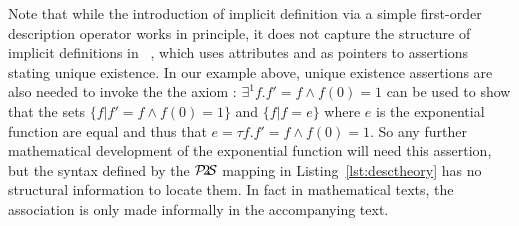 \documentclass{article}
\def\ptos{\ensuremath{\mathcal{P}\kern-.2em2\kern-.2em\mathcal{S}}}
\begin{document}
Note that while the introduction of implicit definition via a simple first-order
description operator works in principle, it does not capture the structure of implicit
definitions in {}~\cite{Kohlhase:OMDoc1.2}, which uses attributes
{} and {} as pointers
to assertions stating unique existence. In our example above, unique existence assertions
are also needed to invoke the the axiom {}: $\exists^1
f.f'=f\wedge f(0)=1$ can be used to show that the sets $\{f\bigl|f'=f\wedge f(0)=1\}$ and
$\{f\bigl|f=e\}$ where $e$ is the exponential function are equal and thus that $e=\tau
f. f'=f\wedge f(0)=1$. So any further mathematical development of the exponential function
will need this assertion, but the syntax defined by the {\ptos} mapping in
Listing~\ref{lst:desctheory} has no structural information to locate them. In fact in
mathematical texts, the association is only made informally in the accompanying text.
\end{document}
